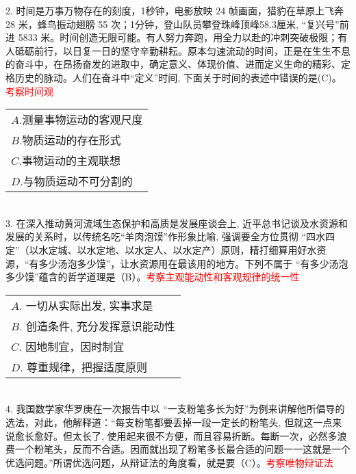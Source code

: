 \documentclass[a4paper,12pt]{article}
\begin{document}
2. 时间是万事万物存在的刻度，1秒钟，电影放映 24 帧画面，猎豹在草原上飞奔 28 米，蜂鸟振动翅膀 55 次；1分钟，登山队员攀登珠峰顶峰58.3厘米, “复兴号”前进 5833 米。时间创造无限可能。有人努力奔跑，用全力以赴的冲刺突破极限；有人砥砺前行，以日复一日的坚守辛勤耕耘。原本匀速流动的时间，正是在生生不息的奋斗中，在昂扬奋发的进取中，确定意义、体现价值、进而定义生命的精彩、定格历史的脉动。人们在奋斗中“定义”时间, 下面关于时间的表述中错误的是(C)。\textcolor{red}{考察时间观}

\noindent\begin{tabular}{l}
$ A $.测量事物运动的客观尺度\\
$ B $.物质运动的存在形式\\
$ C $.事物运动的主观联想\\
$ D $.与物质运动不可分割的\\
\end{tabular}\\



3. 在深入推动黄河流域生态保护和高质是发展座谈会上, 近平总书记谈及水资源和发展的关系时，以传统名吃“羊肉泡馍”作形象比喻, 强调要全方位贯彻 “四水四定”（以水定城、以水定地、以水定人、以水定产）原则，精打细算用好水资源，“有多少汤泡多少馍”，让水资源用在最该用的地方。下列不属于 “有多少汤泡多少馍”蕴含的哲学道理是（B）。\textcolor{red}{考察主观能动性和客观规律的统一性}

\noindent\begin{tabular}{l}
$ A $. 一切从实际出发, 实事求是\\
$ B $. 创造条件, 充分发挥意识能动性\\
$ C $. 因地制宜，因时制宜\\
$ D $. 尊重规律，把握适度原则\\
\end{tabular}\\




4. 我国数学家华罗庚在一次报告中以 “一支粉笔多长为好”为例来讲解他所倡导的选法，对此，他解释道：“每支粉笔都要丢掉一段一定长的粉笔头, 但就这一点来说愈长愈好。但太长了, 使用起来很不方便，而且容易折断。每断一次，必然多浪费一个粉笔头，反而不合适。因而就出现了粉笔多长最合适的问题一一这就是一个优选问题。”所谓优选问题，从辩证法的角度看，就是要（C）。\textcolor{red}{考察唯物辩证法}
\end{document}
